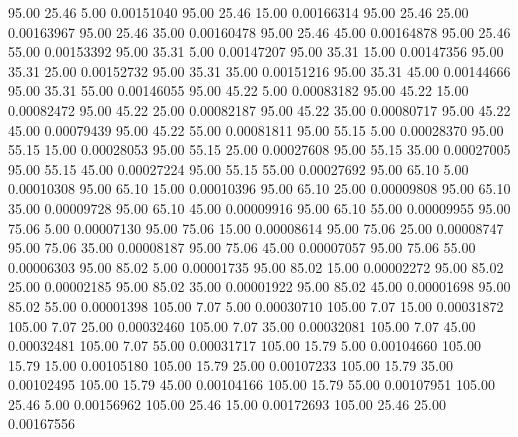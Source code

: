      95.00     25.46      5.00     0.00151040
     95.00     25.46     15.00     0.00166314
     95.00     25.46     25.00     0.00163967
     95.00     25.46     35.00     0.00160478
     95.00     25.46     45.00     0.00164878
     95.00     25.46     55.00     0.00153392
     95.00     35.31      5.00     0.00147207
     95.00     35.31     15.00     0.00147356
     95.00     35.31     25.00     0.00152732
     95.00     35.31     35.00     0.00151216
     95.00     35.31     45.00     0.00144666
     95.00     35.31     55.00     0.00146055
     95.00     45.22      5.00     0.00083182
     95.00     45.22     15.00     0.00082472
     95.00     45.22     25.00     0.00082187
     95.00     45.22     35.00     0.00080717
     95.00     45.22     45.00     0.00079439
     95.00     45.22     55.00     0.00081811
     95.00     55.15      5.00     0.00028370
     95.00     55.15     15.00     0.00028053
     95.00     55.15     25.00     0.00027608
     95.00     55.15     35.00     0.00027005
     95.00     55.15     45.00     0.00027224
     95.00     55.15     55.00     0.00027692
     95.00     65.10      5.00     0.00010308
     95.00     65.10     15.00     0.00010396
     95.00     65.10     25.00     0.00009808
     95.00     65.10     35.00     0.00009728
     95.00     65.10     45.00     0.00009916
     95.00     65.10     55.00     0.00009955
     95.00     75.06      5.00     0.00007130
     95.00     75.06     15.00     0.00008614
     95.00     75.06     25.00     0.00008747
     95.00     75.06     35.00     0.00008187
     95.00     75.06     45.00     0.00007057
     95.00     75.06     55.00     0.00006303
     95.00     85.02      5.00     0.00001735
     95.00     85.02     15.00     0.00002272
     95.00     85.02     25.00     0.00002185
     95.00     85.02     35.00     0.00001922
     95.00     85.02     45.00     0.00001698
     95.00     85.02     55.00     0.00001398
    105.00      7.07      5.00     0.00030710
    105.00      7.07     15.00     0.00031872
    105.00      7.07     25.00     0.00032460
    105.00      7.07     35.00     0.00032081
    105.00      7.07     45.00     0.00032481
    105.00      7.07     55.00     0.00031717
    105.00     15.79      5.00     0.00104660
    105.00     15.79     15.00     0.00105180
    105.00     15.79     25.00     0.00107233
    105.00     15.79     35.00     0.00102495
    105.00     15.79     45.00     0.00104166
    105.00     15.79     55.00     0.00107951
    105.00     25.46      5.00     0.00156962
    105.00     25.46     15.00     0.00172693
    105.00     25.46     25.00     0.00167556
